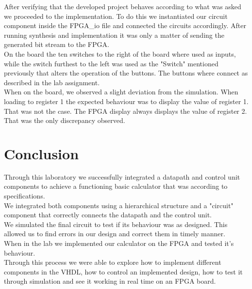 \documentclass[12pt]{article}
\begin{document}
After verifying that the developed project behaves according to what was asked we proceeded to the implementation.
To do this we instantiated our circuit component inside the FPGA\_io file and connected the circuits accordingly. After running synthesis and implementation it was only a matter of sending the generated bit stream to the FPGA.\\

On the board the ten switches to the right of the board where used as inputs, while the switch furthest to the left was used as the "Switch" mentioned previously that alters the operation of the buttons. The buttons where connect as described in the lab assignment.\\

When on the board, we observed a slight deviation from the simulation. When loading to register 1 the expected behaviour was to display the value of register 1. That was not the case. The FPGA display always displays the value of register 2. That was the only discrepancy observed.

\section{Conclusion}

Through this laboratory we successfully integrated a datapath and control unit components to achieve a functioning basic calculator that was according to specifications.\\

We integrated both components using a hierarchical structure and a "circuit" component that correctly connects the datapath and the control unit.\\

We simulated the final circuit to test if its behaviour was as designed. This allowed us to find errors in our design and correct them in timely manner.\\

When in the lab we implemented our calculator on the FPGA and tested it's behaviour.\\

Through this process we were able to explore how to implement different components in the VHDL, how to control an implemented design, how to test it through simulation and see it working in real time on an FPGA board.
\end{document}
